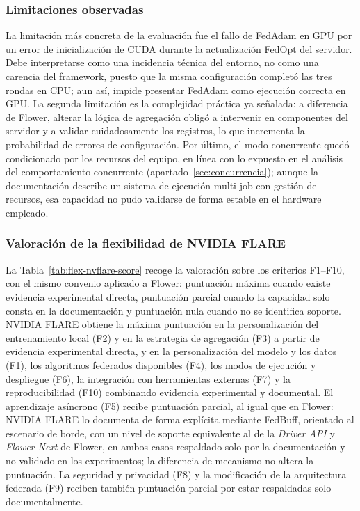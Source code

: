 \subsubsection{Limitaciones observadas}\label{subsec:flex-nvflare-lim}

La limitación más concreta de la evaluación fue el fallo de FedAdam en GPU por un
error de inicialización de CUDA durante la actualización FedOpt del servidor. Debe
interpretarse como una incidencia técnica del entorno, no como una carencia del
framework, puesto que la misma configuración completó las tres rondas en CPU; aun
así, impide presentar FedAdam como ejecución correcta en GPU. La segunda limitación
es la complejidad práctica ya señalada: a diferencia de Flower, alterar la lógica de
agregación obligó a intervenir en componentes del servidor y a validar
cuidadosamente los registros, lo que incrementa la probabilidad de errores de
configuración. Por último, el modo concurrente quedó condicionado por los recursos
del equipo, en línea con lo expuesto en el análisis del comportamiento concurrente
(apartado~\ref{sec:concurrencia}); aunque la documentación describe un sistema de
ejecución multi-job con gestión de recursos, esa capacidad no pudo validarse de forma
estable en el hardware empleado.

\subsubsection{Valoración de la flexibilidad de NVIDIA FLARE}\label{subsec:flex-nvflare-score}

La Tabla~\ref{tab:flex-nvflare-score} recoge la valoración sobre los criterios
F1--F10, con el mismo convenio aplicado a Flower: puntuación máxima cuando existe
evidencia experimental directa, puntuación parcial cuando la capacidad solo consta
en la documentación y puntuación nula cuando no se identifica soporte. NVIDIA FLARE
obtiene la máxima puntuación en la personalización del entrenamiento local (F2) y en
la estrategia de agregación (F3) a partir de evidencia experimental directa, y en la
personalización del modelo y los datos (F1), los algoritmos federados disponibles
(F4), los modos de ejecución y despliegue (F6), la integración con herramientas
externas (F7) y la reproducibilidad (F10) combinando evidencia experimental y
documental. El aprendizaje asíncrono (F5) recibe puntuación parcial,
al igual que en Flower: NVIDIA FLARE lo documenta de forma explícita mediante FedBuff,
orientado al escenario de borde, con un nivel de soporte equivalente al de la
\textit{Driver API} y \textit{Flower Next} de Flower, en ambos casos respaldado solo por
la documentación y no validado en los experimentos; la diferencia de mecanismo no altera
la puntuación. La seguridad y privacidad (F8) y la
modificación de la arquitectura federada (F9) reciben también puntuación parcial por
estar respaldadas solo documentalmente.

